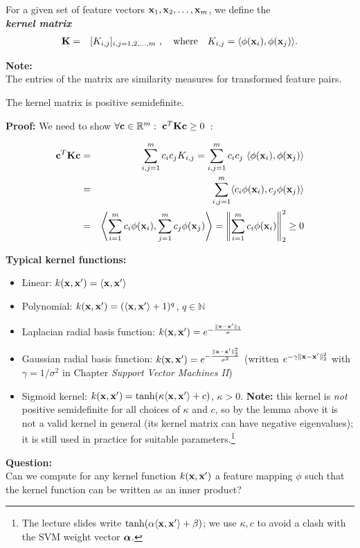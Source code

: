 		For a given set of feature vectors $\bm{\mathrm{x}}_1, \bm{\mathrm{x}}_2, \dots, \bm{\mathrm{x}}_m$, we define the \\
		\textbf {\emph{kernel matrix}}
		\begin{eqnarray*}
			\mathbf{K} &=& [K_{i,j}]_{i,j=1,2,\dots,m}~, \quad \mbox{where} \quad K_{i,j} = \langle\phi(\bm{\mathrm{x}}_i), \phi(\bm{\mathrm{x}}_j)\rangle.
		\end{eqnarray*}

	\textbf {Note:} \\
	The entries of the matrix are similarity measures for transformed feature pairs.
     
	\begin{lemma}
		The kernel matrix is positive semidefinite.
	\end{lemma}
   \textbf {Proof:} We need to show $\forall \bm{\mathrm{c}}\in\mathbb{R}^m:~\bm{\mathrm{c}}^T \mathbf{K} \bm{\mathrm{c}} \geq 0$~:  

	\small
	\begin{eqnarray*}
		\bm{\mathrm{c}}^T \mathbf{K} \bm{\mathrm{c}}
		&=& \sum_{i,j=1}^m c_ic_j K_{i,j}
		=  \sum_{i,j=1}^m c_ic_j\ \langle\phi(\bm{\mathrm{x}}_i), \phi(\bm{\mathrm{x}}_j)\rangle \\  
		&=& \sum_{i,j=1}^m  \langle c_i\phi(\bm{\mathrm{x}}_i), c_j\phi(\bm{\mathrm{x}}_j)\rangle \\  
		&=& \left \langle \sum_{i=1}^m c_i\phi(\bm{\mathrm{x}}_i), \sum_{j=1}^m c_j\phi(\bm{\mathrm{x}}_j)\right\rangle
		=  \left\|\sum_{i=1}^m c_i\phi(\bm{\mathrm{x}}_i)\right\|_2^2
		\geq 0
	\end{eqnarray*}
     
	\textbf {Typical kernel functions:}  

	\begin{itemize}
		\item Linear: $k(\bm{\mathrm{x}}, \bm{\mathrm{x}}') = \langle\bm{\mathrm{x}}, \bm{\mathrm{x}}'\rangle$     
		\item Polynomial: $k(\bm{\mathrm{x}}, \bm{\mathrm{x}}') = (\langle\bm{\mathrm{x}}, \bm{\mathrm{x}}'\rangle+1)^q$, \quad $q\in\mathbb{N}$
		\item Laplacian radial basis function: $k(\bm{\mathrm{x}}, \bm{\mathrm{x}}') = e^{-\frac{\|\bm{\mathrm{x}}- \bm{\mathrm{x}}'\|_1}{\sigma}}$     
		\item Gaussian radial basis function: $k(\bm{\mathrm{x}}, \bm{\mathrm{x}}') = e^{-\frac{\|\bm{\mathrm{x}}- \bm{\mathrm{x}}'\|_2^2}{\sigma^2}}$ (written $e^{-\gamma\|\bm{\mathrm{x}}-\bm{\mathrm{x}}'\|_2^2}$ with $\gamma=1/\sigma^2$ in Chapter \emph{Support Vector Machines II})     
		\item Sigmoid kernel: $k(\bm{\mathrm{x}}, \bm{\mathrm{x}}') =\mbox{tanh}({ \kappa\langle\bm{\mathrm{x}}, \bm{\mathrm{x}}'\rangle+c})$, $\kappa>0$. \textbf{Note:} this kernel is \emph{not} positive semidefinite for all choices of $\kappa$ and $c$, so by the lemma above it is not a valid kernel in general (its kernel matrix can have negative eigenvalues); it is still used in practice for suitable parameters.\footnote{The lecture slides write $\tanh(\alpha\langle\bm{\mathrm{x}},\bm{\mathrm{x}}'\rangle+\beta)$; we use $\kappa,c$ to avoid a clash with the SVM weight vector $\bm{\mathrm{\alpha}}$.}
	\end{itemize}
	\textbf {Question:} \\
	Can we compute for any kernel function $k(\bm{\mathrm{x}}, \bm{\mathrm{x}}')$ a feature mapping $\phi$ such that the kernel function can be written as an inner product?
  	   
